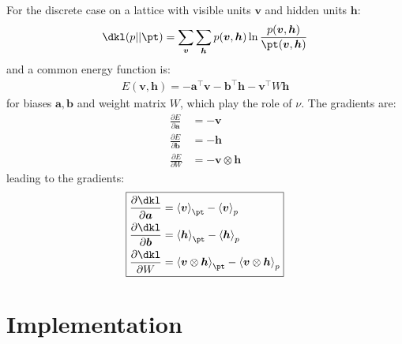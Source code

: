\documentclass[11pt]{article}
\newcommand{\vbf}{\boldsymbol{v}}
\newcommand{\hbf}{\boldsymbol{h}}
\newcommand{\abf}{\boldsymbol{a}}
\newcommand{\bbf}{\boldsymbol{b}}
\begin{document}
For the discrete case on a lattice with visible units $\vbf$ and hidden units $\hbf$:
\begin{equation}
\dkl (p || \pt) = \sum_{\vbf} \sum_{\hbf} p(\vbf, \hbf) \ln \frac{p(\vbf, \hbf)}{\pt(\vbf,\hbf)}
\end{equation}
and a common energy function is:
\begin{equation}
\begin{split}
E(\vbf, \hbf) = - \abf^\intercal \vbf - \bbf^\intercal \hbf - \vbf^\intercal W \hbf
\end{split}
\end{equation}
for biases $\abf,\bbf$ and weight matrix $W$, which play the role of $\nu$. The gradients are:
\begin{equation}
\begin{split}
\frac{\partial E}{\partial \abf} &= - \vbf \\
\frac{\partial E}{\partial \bbf} &= - \hbf \\
\frac{\partial E}{\partial W} &= - \vbf \otimes \hbf
\end{split}
\end{equation}
leading to the gradients:
\begin{equation}
\boxed{
\begin{split}
\frac{\partial \dkl}{\partial \abf} 
&=
\left \langle \vbf \right \rangle_{\pt}
- \left \langle \vbf \right \rangle_p \\
\frac{\partial \dkl}{\partial \bbf} 
&=
\left \langle \hbf \right \rangle_{\pt}
- \left \langle \hbf \right \rangle_p \\
\frac{\partial \dkl}{\partial W} 
&=
\left \langle \vbf \otimes \hbf \right \rangle_{\pt}
- \left \langle \vbf \otimes \hbf \right \rangle_p 
\end{split}
}
\end{equation}


\section{Implementation}

\end{document}

